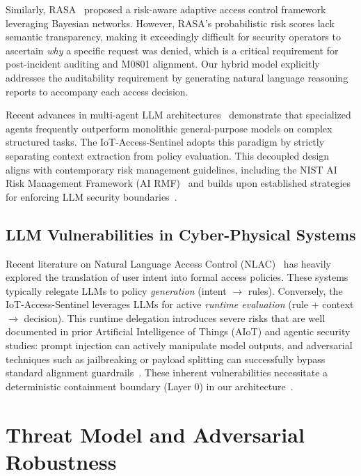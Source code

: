 \documentclass[
]{ceurart}
\begin{document}
Similarly, RASA~\cite{rasa2021} proposed a risk-aware adaptive access control framework leveraging Bayesian networks. However, RASA's probabilistic risk scores lack semantic transparency, making it exceedingly difficult for security operators to ascertain \textit{why} a specific request was denied, which is a critical requirement for post-incident auditing and M0801 alignment. Our hybrid model explicitly addresses the auditability requirement by generating natural language reasoning reports to accompany each access decision.

Recent advances in multi-agent LLM architectures~\cite{multiagent2023} demonstrate that specialized agents frequently outperform monolithic general-purpose models on complex structured tasks. The IoT-Access-Sentinel adopts this paradigm by strictly separating context extraction from policy evaluation. This decoupled design aligns with contemporary risk management guidelines, including the NIST AI Risk Management Framework (AI RMF)~\cite{nist_airmf_2023} and builds upon established strategies for enforcing LLM security boundaries~\cite{doshi2024llms}.


\subsection{LLM Vulnerabilities in Cyber-Physical Systems}

Recent literature on Natural Language Access Control (NLAC)~\cite{lace2025, xu2022building} has heavily explored the translation of user intent into formal access policies. These systems typically relegate LLMs to policy \textit{generation} (intent $\rightarrow$ rules). Conversely, the IoT-Access-Sentinel leverages LLMs for active \textit{runtime evaluation} (rule + context $\rightarrow$ decision). This runtime delegation introduces severe risks that are well documented in prior Artificial Intelligence of Things (AIoT) and agentic security studies: prompt injection can actively manipulate model outputs, and adversarial techniques such as jailbreaking or payload splitting can successfully bypass standard alignment guardrails~\cite{yao2024survey, agentsec2025, wei2023jailbroken, liu2024autodan, fang2024llm}. These inherent vulnerabilities necessitate a deterministic containment boundary (Layer 0) in our architecture~\cite{doshi2024llms}.

\section{Threat Model and Adversarial Robustness}\label{sec:threat_model}
\end{document}
